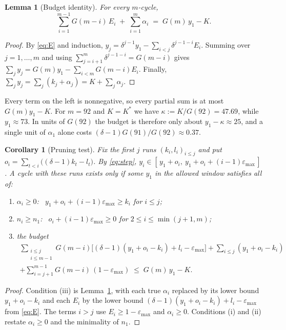 \documentclass[11pt]{amsart}
\newtheorem{lemma}[theorem]{Lemma}
\newtheorem{corollary}[theorem]{Corollary}
\theoremstyle{definition}
\theoremstyle{remark}
\newcommand{\Kst}{K^{*}}
\newcommand{\epsmax}{\varepsilon_{\max}}
\begin{document}
\begin{lemma}[Budget identity]\label{lem:budget}
For every $m$-cycle,
\[
  \sum_{i=1}^{m-1} G(m-i)\, E_i \;+\; \sum_{i=1}^{m} \alpha_i \;=\; G(m)\, y_1 - K .
\]
\end{lemma}

\begin{proof}
By \eqref{eq:E} and induction, $y_j = \delta^{j-1}y_1 - \sum_{i<j}\delta^{j-1-i}E_i$. Summing over
$j = 1, \dots, m$ and using $\sum_{j=i+1}^{m}\delta^{j-1-i} = G(m-i)$ gives
$\sum_j y_j = G(m)y_1 - \sum_{i<m} G(m-i)E_i$. Finally,
$\sum_j y_j = \sum_j (k_j + \alpha_j) = K + \sum_j \alpha_j$.
\end{proof}

Every term on the left is nonnegative, so every partial sum is at most $G(m)y_1 - K$. For
$m = 92$ and $K = \Kst$ we have $\kappa := K/G(92) = 47.69$, while $y_1 \approx 73$. In units of
$G(92)$ the budget is therefore only about $y_1 - \kappa \approx 25$, and a single unit of $\alpha_1$
alone costs $(\delta - 1)G(91)/G(92) \approx 0.37$.

\begin{corollary}[Pruning test]\label{cor:prune}
Fix the first $j$ runs $(k_i, l_i)_{i \le j}$ and put $o_i = \sum_{t<i}\big((\delta-1)k_t - l_t\big)$.
By \eqref{eq:step}, $y_i \in [\,y_1 + o_i,\ y_1 + o_i + (i-1)\epsmax\,]$. A cycle with these runs
exists only if some $y_1$ in the allowed window satisfies all of:
\begin{enumerate}[label=(\roman*)]
  \item $\alpha_i \ge 0$: \ $y_1 + o_i + (i-1)\epsmax \ge k_i$ for $i \le j$;
  \item $n_i \ge n_1$: \ $o_i + (i-1)\epsmax \ge 0$ for $2 \le i \le \min(j+1, m)$;
  \item the budget
  \begin{multline*}
    \sum_{\substack{i \le j\\ i \le m-1}} G(m-i)\Big[(\delta-1)(y_1 + o_i - k_i) + l_i - \epsmax\Big]
    + \sum_{i \le j}(y_1 + o_i - k_i) \\
    + \sum_{i=j+1}^{m-1} G(m-i)\,(1 - \epsmax)
    \;\le\; G(m)\,y_1 - K .
  \end{multline*}
\end{enumerate}
\end{corollary}

\begin{proof}
Condition (iii) is Lemma~\ref{lem:budget}, with each true $\alpha_i$ replaced by its lower bound
$y_1 + o_i - k_i$ and each $E_i$ by the lower bound $(\delta-1)(y_1+o_i-k_i) + l_i - \epsmax$ from
\eqref{eq:E}. The terms $i > j$ use $E_i \ge 1 - \epsmax$ and $\alpha_i \ge 0$. Conditions (i) and
(ii) restate $\alpha_i \ge 0$ and the minimality of $n_1$.
\end{proof}
\end{document}
